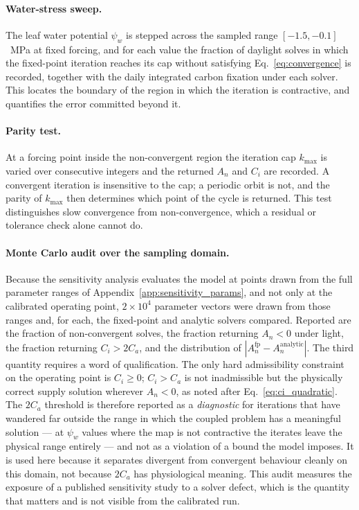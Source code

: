 \documentclass[a4paper,fleqn]{cas-sc}
\begin{document}
\paragraph{Water-stress sweep.}
The leaf water potential $\psi_w$ is stepped across the sampled range
$[-1.5,-0.1]$~MPa at fixed forcing, and for each value the fraction of
daylight solves in which the fixed-point iteration reaches its cap without
satisfying Eq.~\eqref{eq:convergence} is recorded, together with the daily
integrated carbon fixation under each solver. This locates the boundary of
the region in which the iteration is contractive, and quantifies the error
committed beyond it.

\paragraph{Parity test.}
At a forcing point inside the non-convergent region the iteration cap
$k_{\max}$ is varied over consecutive integers and the returned $A_n$ and
$C_i$ are recorded. A convergent iteration is insensitive to the cap; a
periodic orbit is not, and the parity of $k_{\max}$ then determines which
point of the cycle is returned. This test distinguishes slow convergence
from non-convergence, which a residual or tolerance check alone cannot do.

\paragraph{Monte Carlo audit over the sampling domain.}
Because the sensitivity analysis evaluates the model at points drawn from
the full parameter ranges of Appendix~\ref{app:sensitivity_params}, and not
only at the calibrated operating point, $2\times10^{4}$ parameter vectors
were drawn from those ranges and, for each, the fixed-point and analytic
solvers compared. Reported are the fraction of non-convergent solves, the
fraction returning $A_n<0$ under light, the fraction returning
$C_i>2C_a$, and the distribution of $|A_n^{\text{fp}} -
A_n^{\text{analytic}}|$. The third quantity requires a word of
qualification. The only hard admissibility constraint on the operating point
is $C_i \ge 0$; $C_i > C_a$ is not inadmissible but the physically correct
supply solution wherever $A_n<0$, as noted after
Eq.~\eqref{eq:ci_quadratic}. The $2C_a$ threshold is therefore reported as a
\emph{diagnostic} for iterations that have wandered far outside the range in
which the coupled problem has a meaningful solution --- at $\psi_w$ values
where the map is not contractive the iterates leave the physical range
entirely --- and not as a violation of a bound the model imposes. It is used
here because it separates divergent from convergent behaviour cleanly on this
domain, not because $2C_a$ has physiological meaning. This audit measures the exposure of a published
sensitivity study to a solver defect, which is the quantity that matters
and is not visible from the calibrated run.
\end{document}
